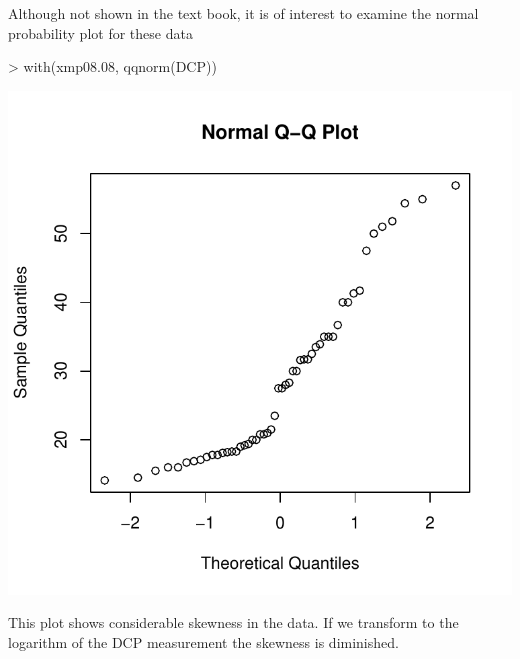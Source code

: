 \documentclass{book}
\begin{document}
Although not shown in the text book, it is of interest to examine the
normal probability plot for these data
\begin{center}
\begin{Schunk}
\begin{Sinput}
> with(xmp08.08, qqnorm(DCP))
\end{Sinput}
\end{Schunk}
\includegraphics{Devore6-xmp0808b}
\end{center}
This plot shows considerable skewness in the data.  If we transform to
the logarithm of the DCP measurement the skewness is diminished.
\end{document}

